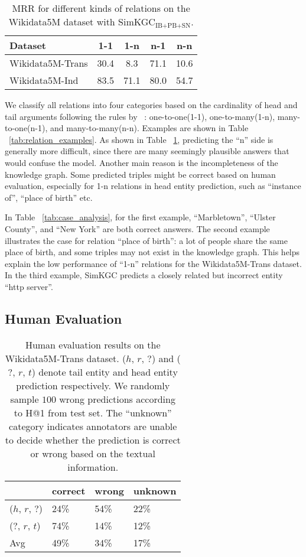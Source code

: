 \documentclass[11pt]{article}
\begin{document}
\begin{table}[ht]
\centering
\begin{tabular}{l|cccc}
\hline
Dataset & 1-1 & 1-n & n-1 & n-n \\ \hline
Wikidata5M-Trans & 30.4 & 8.3 & 71.1 & 10.6 \\
Wikidata5M-Ind & 83.5 & 71.1 & 80.0 & 54.7 \\ \hline
\end{tabular}
\caption{MRR for different kinds of relations
on the Wikidata5M dataset with SimKGC$_\text{IB+PB+SN}$.}
\label{tab:perf_by_relation}
\end{table}

We classify all relations into four categories
based on the cardinality of head and tail arguments
following the rules by ~\citet{bordes2013translating}:
one-to-one(1-1),
one-to-many(1-n),
many-to-one(n-1),
and many-to-many(n-n).
Examples are shown in Table ~\ref{tab:relation_examples}.
As shown in Table ~\ref{tab:perf_by_relation},
predicting the ``n'' side is generally more difficult,
since there are many seemingly plausible answers
that would confuse the model.
Another main reason is the incompleteness of the knowledge graph.
Some predicted triples might be correct based on human evaluation,
especially for 1-n relations in head entity prediction,
such as ``instance of'', ``place of birth'' etc.

In Table ~\ref{tab:case_analysis},
for the first example,
``Marbletown'', ``Ulster County'', and ``New York'' are both correct answers.
The second example illustrates the case for relation ``place of birth'':
a lot of people share the same place of birth,
and some triples may not exist in the knowledge graph.
This helps explain the low performance of ``1-n'' relations for the Wikidata5M-Trans dataset.
In the third example,
SimKGC predicts a closely related but incorrect entity ``http server''.

\subsection{Human Evaluation}

\begin{table}[ht]
\centering
\begin{tabular}{l|lll}
\hline
         & correct & wrong & unknown \\ \hline
($h$, $r$, $?$)  & 24\% & 54\% & 22\% \\
($?$, $r$, $t$) & 74\% & 14\% & 12\% \\
Avg   & 49\%  & 34\% & 17\% \\ \hline
\end{tabular}
\caption{Human evaluation results on the Wikidata5M-Trans dataset.
($h$, $r$, $?$) and ($?$, $r$, $t$) denote tail entity and head entity prediction respectively.
We randomly sample $100$ wrong predictions according to H@1 from test set.
The ``unknown'' category indicates annotators are unable to decide
whether the prediction is correct or wrong
based on the textual information.}
\label{tab:human_eval}
\end{table}
\end{document}
